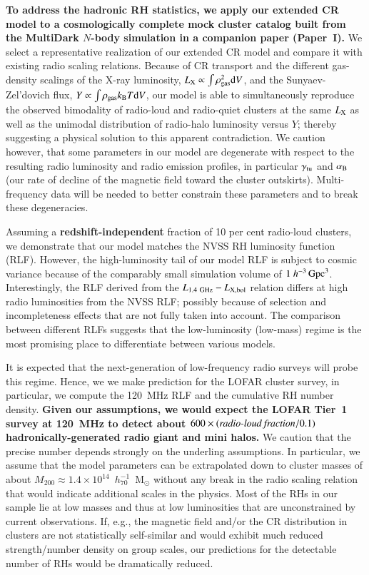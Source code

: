 \documentclass[useAMS,usenatbib]{mn2e}
\newcommand{\dd}{\mathrm{d}}
\begin{document}
{\bf To address the hadronic RH statistics, we apply our extended CR model 
to a cosmologically complete mock cluster catalog built from the MultiDark
$N$-body simulation in a companion paper (Paper~I).} We select a representative 
realization of our extended CR model and compare it with existing radio scaling relations. 
Because of CR transport and the different gas-density scalings of the X-ray luminosity,
$L_{\rmn{X}}\propto\int \rho_\rmn{gas}^2 \dd V$, and the Sunyaev-Zel'dovich
flux, $Y\propto\int \rho_{\rmn{gas}} k_{\rmn{B}} T \dd V$, our model is able to
simultaneously reproduce the observed bimodality of radio-loud and radio-quiet
clusters at the same $L_{{\mathrm{X}}}$ as well as the unimodal distribution of
radio-halo luminosity versus $Y$; thereby suggesting a physical solution to this
apparent contradiction. We caution however, that some parameters in our model
are degenerate with respect to the resulting radio luminosity and radio emission
profiles, in particular $\gamma_{{\mathrm{tu}}}$ and $ \alpha_{{\mathrm{B}}}$ (our rate of decline
of the magnetic field toward the cluster outskirts). Multi-frequency data will
be needed to better constrain these parameters and to break these degeneracies.

Assuming a {\bf redshift-independent} fraction of 10 per cent radio-loud
clusters, we demonstrate that our model matches the NVSS RH luminosity function
(RLF). However, the high-luminosity tail of our model RLF is subject to cosmic
variance because of the comparably small simulation volume of $1~h^{-3}
\,{\mathrm{Gpc}}^3$. Interestingly, the RLF derived from the
$L_{1.4~{\mathrm{GHz}}}-L_{{\mathrm{X,bol}}}$ relation differs at high radio luminosities
from the NVSS RLF; possibly because of selection and incompleteness effects that
are not fully taken into account. The comparison between different RLFs suggests
that the low-luminosity (low-mass) regime is the most promising place to
differentiate between various models.

It is expected that the next-generation of low-frequency radio surveys will
probe this regime. Hence, we we make prediction for the LOFAR cluster survey, in
particular, we compute the 120~MHz RLF and the cumulative RH number
density. {\bf Given our assumptions, we would expect the LOFAR Tier~1 survey at
120~MHz to detect about $600\times ({\mathrm{\emph{radio-loud~fraction}/0.1}})$ 
hadronically-generated radio giant and mini halos.} 
We caution that the precise number depends strongly on the underling assumptions. 
In particular, we assume that the model parameters can be extrapolated down to cluster 
masses of about $M_{200}\approx1.4\times10^{14}$~$h_{70}^{-1}$~M$_{\odot}$ without 
any break in the radio scaling relation that would indicate additional scales in the physics.
Most of the RHs in our sample lie at low masses and thus at low luminosities
that are unconstrained by current observations. If, e.g., the magnetic field
and/or the CR distribution in clusters are not statistically self-similar and
would exhibit much reduced strength/number density on group scales, our
predictions for the detectable number of RHs would be dramatically reduced.
\end{document}
